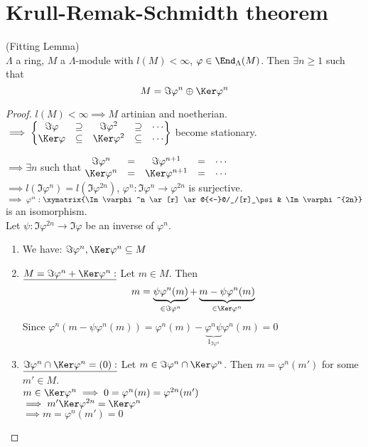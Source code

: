 \section{Krull-Remak-Schmidth theorem}

\begin{lem}
(Fitting Lemma)\\
$\Lambda$ a ring, $M$ a $\Lambda$-module with $l(M) < \infty$, $\varphi \in \End_\Lambda(M)$. Then $\exists n \geq 1$ such that \[M = \Im \varphi^n \oplus \Ker \varphi^n\]

\begin{proof}
$l(M) < \infty \implies M$ artinian and noetherian.\\
$\implies \left\lbrace \begin{matrix}
\Im \varphi & \supseteq & \Im \varphi^2 & \supseteq & \cdots\\
\Ker \varphi & \subseteq & \Ker \varphi^2 & \subseteq & \cdots\\ 
\end{matrix} \right\rbrace$ become stationary.

$\implies \exists n$ such that $\begin{matrix}
\Im \varphi^n & = & \Im \varphi^{n+1} & = & \cdots\\
\Ker \varphi^n & = & \Ker \varphi^{n+1} & = & \cdots\\ 
\end{matrix}$\\
$\implies l(\Im \varphi^n) = l(\Im \varphi^{2n})$, $\varphi^n : \Im \varphi^n \to \varphi^{2n}$ is surjective.\\
$\implies \varphi^n: \xymatrix{\Im \varphi^n \ar[r] \ar@{<--}@/_/[r]_\psi & \Im \varphi^{2n}}$ is an isomorphism.\\
Let $\psi: \Im \varphi^{2n} \to \Im \varphi$ be an inverse of $\varphi^n$.
\begin{enumerate}
\item We have: $\Im \varphi^n, \Ker \varphi^n \subseteq M$
\item $\underline{M = \Im \varphi^n + \Ker \varphi^n :}$ Let $m \in M$. Then \[m = \underbrace{\psi\varphi^n(m)}_{\in \Im \varphi^n} + \underbrace{m - \psi\varphi^n(m)}_{\in \Ker \varphi^n}\]
Since $\varphi^n(m - \psi\varphi^n(m)) = \varphi^n(m) - \underbrace{\varphi^n\psi}_{1_{\Im \varphi^n}}\varphi^n(m) = 0$
\item $\underline{\Im \varphi^n \cap \Ker \varphi^n = (0):}$ Let $m \in \Im \varphi^n \cap \Ker \varphi^n$. Then $m = \varphi^n(m')$ for some $m' \in M$.\\
$m \in \Ker \varphi^n \implies 0 = \varphi^n(m) = \varphi^{2n}(m')$\\
$\implies m' \Ker \varphi^{2n} = \Ker \varphi^n$\\
$\implies m = \varphi^n(m') = 0$
\end{enumerate}
\end{proof}
\end{lem}

